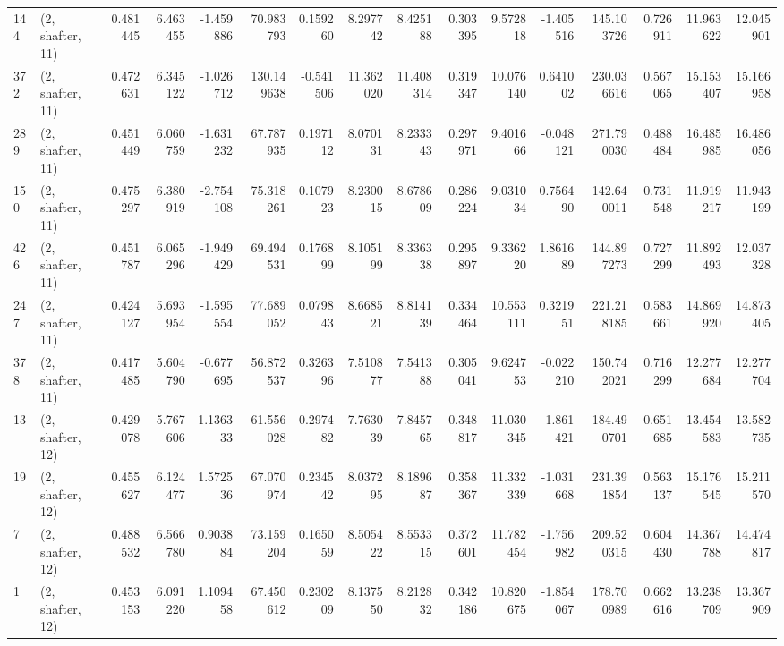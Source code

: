 \begin{tabular}{llrrrrrrrrrrrrrr}
144 &  (2, shafter, 11) &   0.481445 &   6.463455 &  -1.459886 &    70.983793 &   0.159260 &   8.297742 &   8.425188 &  0.303395 &   9.572818 &  -1.405516 &   145.103726 &   0.726911 &  11.963622 &  12.045901 \\
372 &  (2, shafter, 11) &   0.472631 &   6.345122 &  -1.026712 &   130.149638 &  -0.541506 &  11.362020 &  11.408314 &  0.319347 &  10.076140 &   0.641002 &   230.036616 &   0.567065 &  15.153407 &  15.166958 \\
289 &  (2, shafter, 11) &   0.451449 &   6.060759 &  -1.631232 &    67.787935 &   0.197112 &   8.070131 &   8.233343 &  0.297971 &   9.401666 &  -0.048121 &   271.790030 &   0.488484 &  16.485985 &  16.486056 \\
150 &  (2, shafter, 11) &   0.475297 &   6.380919 &  -2.754108 &    75.318261 &   0.107923 &   8.230015 &   8.678609 &  0.286224 &   9.031034 &   0.756490 &   142.640011 &   0.731548 &  11.919217 &  11.943199 \\
426 &  (2, shafter, 11) &   0.451787 &   6.065296 &  -1.949429 &    69.494531 &   0.176899 &   8.105199 &   8.336338 &  0.295897 &   9.336220 &   1.861689 &   144.897273 &   0.727299 &  11.892493 &  12.037328 \\
247 &  (2, shafter, 11) &   0.424127 &   5.693954 &  -1.595554 &    77.689052 &   0.079843 &   8.668521 &   8.814139 &  0.334464 &  10.553111 &   0.321951 &   221.218185 &   0.583661 &  14.869920 &  14.873405 \\
378 &  (2, shafter, 11) &   0.417485 &   5.604790 &  -0.677695 &    56.872537 &   0.326396 &   7.510877 &   7.541388 &  0.305041 &   9.624753 &  -0.022210 &   150.742021 &   0.716299 &  12.277684 &  12.277704 \\
13  &  (2, shafter, 12) &   0.429078 &   5.767606 &   1.136333 &    61.556028 &   0.297482 &   7.763039 &   7.845765 &  0.348817 &  11.030345 &  -1.861421 &   184.490701 &   0.651685 &  13.454583 &  13.582735 \\
19  &  (2, shafter, 12) &   0.455627 &   6.124477 &   1.572536 &    67.070974 &   0.234542 &   8.037295 &   8.189687 &  0.358367 &  11.332339 &  -1.031668 &   231.391854 &   0.563137 &  15.176545 &  15.211570 \\
7   &  (2, shafter, 12) &   0.488532 &   6.566780 &   0.903884 &    73.159204 &   0.165059 &   8.505422 &   8.553315 &  0.372601 &  11.782454 &  -1.756982 &   209.520315 &   0.604430 &  14.367788 &  14.474817 \\
1   &  (2, shafter, 12) &   0.453153 &   6.091220 &   1.109458 &    67.450612 &   0.230209 &   8.137550 &   8.212832 &  0.342186 &  10.820675 &  -1.854067 &   178.700989 &   0.662616 &  13.238709 &  13.367909 \\

\end{tabular}
